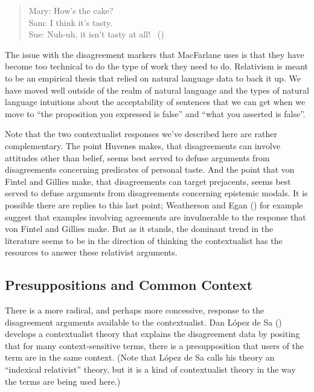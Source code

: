 \documentclass[
  10pt,
  letterpaper,
  DIV=11,
  numbers=noendperiod,
  twoside]{scrartcl}
\begin{document}
\begin{quote}
Mary: How's the cake?\\
Sam: I think it's tasty.\\
Sue: Nuh-uh, it isn't tasty at all!
~()
\end{quote}

The issue with the disagreement markers that MacFarlane uses is that
they have become too technical to do the type of work they need to do.
Relativism is meant to be an empirical thesis that relied on natural
language data to back it up. We have moved well outside of the realm of
natural language and the types of natural language intuitions about the
acceptability of sentences that we can get when we move to ``the
proposition you expressed is false'' and ``what you asserted is false''.

Note that the two contextualist responses we've described here are
rather complementary. The point Huvenes makes, that disagreements can
involve attitudes other than belief, seems best served to defuse
arguments from disagreements concerning predicates of personal taste.
And the point that von Fintel and Gillies make, that disagreements can
target prejacents, seems best served to defuse arguments from
disagreements concerning epistemic modals. It is possible there are
replies to this last point; Weatherson and Egan
() for example suggest that
examples involving agreements are invulnerable to the response that von
Fintel and Gillies make. But as it stands, the dominant trend in the
literature seems to be in the direction of thinking the contextualist
has the resources to answer these relativist arguments.

\subsection{Presuppositions and Common
Context}\label{presuppositionsandcommoncontext}

There is a more radical, and perhaps more concessive, response to the
disagreement arguments available to the contextualist. Dan López de Sa
() develops a contextualist theory
that explains the disagreement data by positing that for many
context-sensitive terms, there is a presupposition that users of the
term are in the same context. (Note that López de Sa calls his theory an
``indexical relativist'' theory, but it is a kind of contextualist
theory in the way the terms are being used here.)
\end{document}
